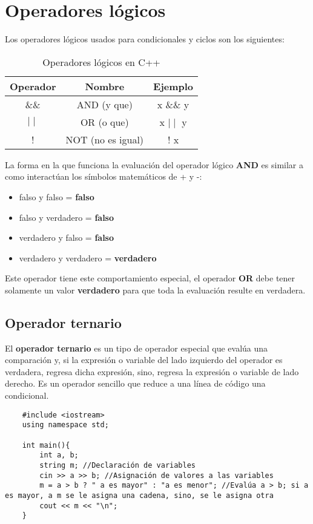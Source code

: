 \section{Operadores lógicos}
Los operadores lógicos usados para condicionales y ciclos son los siguientes:
\begin{table}[ht]
    \begin{center}
        \caption{Operadores lógicos en C++}
        \label{tab: 4}
        \begin{tabular}{c c c}
            \hline
            \textbf{Operador}&\textbf{Nombre}&\textbf{Ejemplo} \\
            \hline
            \&\& & AND (y que) & x \&\& y \\
            $\mid\mid$ & OR (o que) & x $\mid\mid$ y \\
            ! & NOT (no es igual) & ! x \\
            \hline
        \end{tabular}
    \end{center}
\end{table}
La forma en la que funciona la evaluación del operador lógico \textbf{AND} es similar a como interactúan los símbolos matemáticos de + y -:
\begin{itemize}
    \item falso y falso = \textbf{falso}
    \item falso y verdadero = \textbf{falso}
    \item verdadero y falso = \textbf{falso}
    \item verdadero y verdadero = \textbf{verdadero}
\end{itemize}
Este operador tiene este comportamiento especial, el operador \textbf{OR} debe tener solamente un valor \textbf{verdadero} para que toda la evaluación resulte en verdadera.

\subsection{Operador ternario}
El \textbf{operador ternario} es un tipo de operador especial que evalúa una comparación y, si la expresión o variable del lado izquierdo del operador es verdadera, regresa dicha expresión, sino, regresa la expresión o variable de lado derecho. Es un operador sencillo que reduce a una línea de código una condicional.
\begin{lstlisting}
    #include <iostream>
    using namespace std;
    
    int main(){
        int a, b;
        string m; //Declaración de variables
        cin >> a >> b; //Asignación de valores a las variables
        m = a > b ? " a es mayor" : "a es menor"; //Evalúa a > b; si a es mayor, a m se le asigna una cadena, sino, se le asigna otra
        cout << m << "\n";
    }
\end{lstlisting}